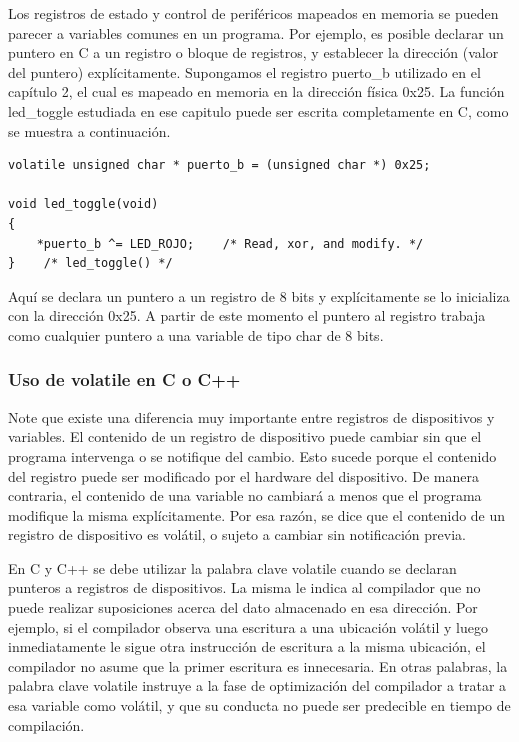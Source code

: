 \documentclass[output=paper, 
colorlinks,
citecolor=brown,
newtxmath
]{langscibook}
\begin{document}
Los registros de estado y control de periféricos mapeados en memoria se pueden
parecer a variables comunes en un programa. Por ejemplo, es posible 
declarar un puntero en C a un registro o bloque de registros, 
y establecer
la dirección (valor del puntero) explícitamente. Supongamos el registro
puerto\_b utilizado en el capítulo 2, el cual es mapeado en memoria en la dirección 
física 0x25. La función led\_toggle estudiada en ese capitulo puede ser 
escrita completamente en C, como se muestra a continuación.

\begin{verbatim}
volatile unsigned char * puerto_b = (unsigned char *) 0x25;

void led_toggle(void)
{
    *puerto_b ^= LED_ROJO;    /* Read, xor, and modify. */
}    /* led_toggle() */
\end{verbatim}

Aquí se declara un puntero a un registro de 8 bits y explícitamente se lo
inicializa con  la dirección 0x25. A partir de este momento el puntero al 
registro
trabaja como cualquier puntero a una variable de tipo char de 8 bits.


\subsubsection {Uso de volatile en C o C++}

Note que existe una diferencia muy importante entre 
registros de dispositivos y variables. El contenido de un registro
de dispositivo puede cambiar sin que el programa intervenga o se notifique
del cambio. Esto sucede porque el contenido del registro puede ser modificado
por el hardware del dispositivo. De manera contraria, el contenido de una
variable no cambiará a menos que el programa modifique la misma explícitamente.
Por esa razón, se dice que el contenido de un registro de dispositivo
es volátil, o sujeto a cambiar sin notificación previa.

En C y C++ se debe utilizar la palabra clave volatile cuando se 
declaran punteros a registros de dispositivos.
La misma le indica al compilador que no puede realizar suposiciones acerca
del dato almacenado en esa dirección. Por ejemplo, si el compilador
observa una escritura a una ubicación volátil y luego inmediatamente 
le sigue otra instrucción de escritura a la misma ubicación, el compilador 
no asume  que la primer escritura es innecesaria. En otras palabras, la
palabra clave volatile instruye a la fase de optimización del compilador 
a tratar a esa variable como volátil, y que su conducta no puede ser
predecible en tiempo de compilación.
\end{document}
